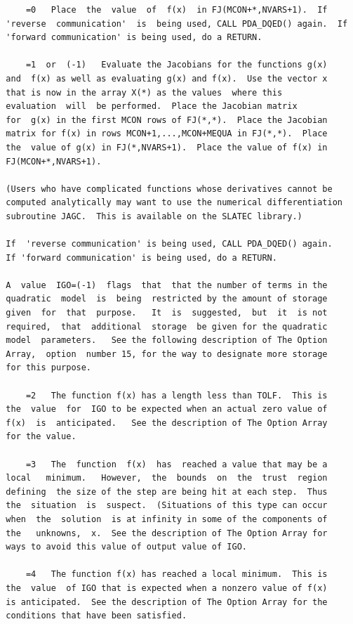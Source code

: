 \documentclass[11pt,twoside]{article}
\begin{document}
\begin{verbatim}
      =0   Place  the  value  of  f(x)  in FJ(MCON+*,NVARS+1).  If
  'reverse  communication'  is  being used, CALL PDA_DQED() again.  If
  'forward communication' is being used, do a RETURN.

      =1  or  (-1)   Evaluate the Jacobians for the functions g(x)
  and  f(x) as well as evaluating g(x) and f(x).  Use the vector x
  that is now in the array X(*) as the values  where this
  evaluation  will  be performed.  Place the Jacobian matrix
  for  g(x) in the first MCON rows of FJ(*,*).  Place the Jacobian
  matrix for f(x) in rows MCON+1,...,MCON+MEQUA in FJ(*,*).  Place
  the  value of g(x) in FJ(*,NVARS+1).  Place the value of f(x) in
  FJ(MCON+*,NVARS+1).

  (Users who have complicated functions whose derivatives cannot be
  computed analytically may want to use the numerical differentiation
  subroutine JAGC.  This is available on the SLATEC library.)

  If  'reverse communication' is being used, CALL PDA_DQED() again.
  If 'forward communication' is being used, do a RETURN.

  A  value  IGO=(-1)  flags  that  that the number of terms in the
  quadratic  model  is  being  restricted by the amount of storage
  given  for  that  purpose.   It  is  suggested,  but  it  is not
  required,  that  additional  storage  be given for the quadratic
  model  parameters.   See the following description of The Option
  Array,  option  number 15, for the way to designate more storage
  for this purpose.

      =2   The function f(x) has a length less than TOLF.  This is
  the  value  for  IGO to be expected when an actual zero value of
  f(x)  is  anticipated.   See the description of The Option Array
  for the value.

      =3   The  function  f(x)  has  reached a value that may be a
  local   minimum.   However,  the  bounds  on  the  trust  region
  defining  the size of the step are being hit at each step.  Thus
  the  situation  is  suspect.  (Situations of this type can occur
  when  the  solution  is at infinity in some of the components of
  the   unknowns,  x.  See the description of The Option Array for
  ways to avoid this value of output value of IGO.

      =4   The function f(x) has reached a local minimum.  This is
  the  value  of IGO that is expected when a nonzero value of f(x)
  is anticipated.  See the description of The Option Array for the
  conditions that have been satisfied.


\end{verbatim}
\end{document}
